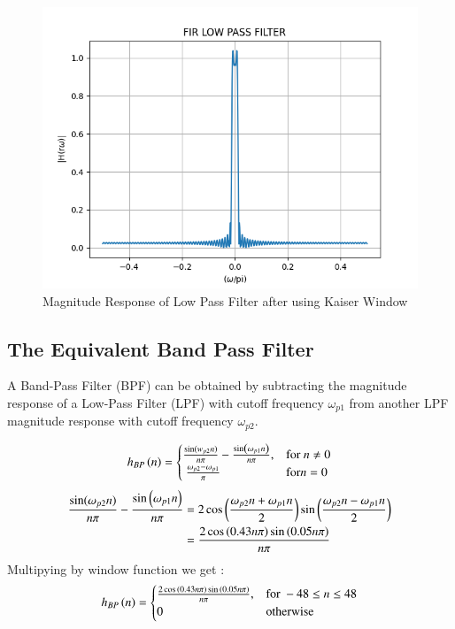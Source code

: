 \documentclass{article}
\begin{document}
\begin{figure}[H]
\centering
\includegraphics[width=1\columnwidth]{figs/FIR_Low_Filter.png}
\caption{Magnitude Response of Low Pass Filter after using Kaiser Window}
\label{fig:Kaiser_LPF_response}
\end{figure}

\subsection{The Equivalent Band Pass Filter}
A Band-Pass Filter (BPF) can be obtained by subtracting the magnitude response of a Low-Pass Filter (LPF) with cutoff frequency $\omega_{p1}$ from another LPF magnitude response with cutoff frequency $\omega_{p2}$.

\begin{align}
    h_{BP}\left(n\right) = 
\begin{cases} 
    \frac{\sin(w_{p2} n)}{n\pi} -\frac{\sin\left(\omega_{p1}n\right)}{n\pi},  & \text{for } n\neq 0\\\
    \frac{\omega_{p2}-\omega_{p1}}{\pi} &\text{for} n= 0
\end{cases} \label{eq:h(n)desired_for_LPF}
\end{align}
\begin{align}
     \frac{\sin(\omega_{p2} n)}{n\pi} -\frac{\sin\left(\omega_{p1}n\right)}{n\pi} &= 2\cos{\ensuremath{\left(\frac{\omega_{p2}n+\omega_{p1}n}{2}\right)}}\sin{\ensuremath{\left(\frac{\omega_{p2}n-\omega_{p1}n}{2}\right)}}\\
            &= \frac{2\cos{\ensuremath{\left(0.43n\pi\right)}}\sin{\ensuremath{\left(0.05n\pi\right)}}}{n\pi}
\end{align}
Multipying by window function we get :
\begin{align}
    h_{BP}\left(n\right) = 
\begin{cases} 
   \frac{2\cos{\ensuremath{\left(0.43n\pi\right)}}\sin{\ensuremath{\left(0.05n\pi\right)}}}{n\pi},  & \text{for } -48\leq n \leq 48 \\
    0 &\text{otherwise}
\end{cases} \label{eq:h(n)desired_for_LPF}
\end{align}
\end{document}
